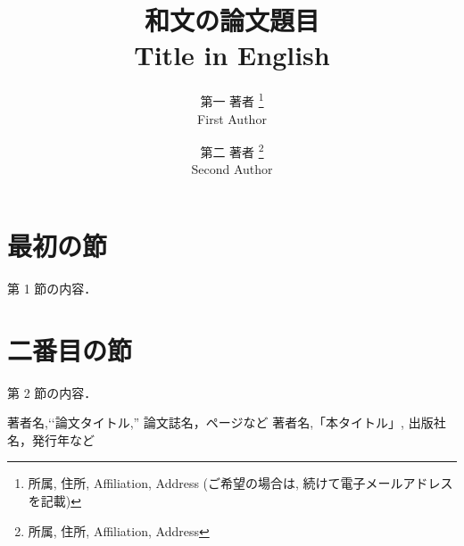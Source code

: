 \documentclass{jarticle} %
\begin{document}
\title{
	和文の論文題目
	\\
	Title in English
}

\author{
	第一 著者             %
	\thanks{
		所属, 住所,         %
		Affiliation, Address    %
		(ご希望の場合は, 続けて電子メールアドレスを記載)
	}\\
	First Author          %
	\and
	第二 著者             %
	\thanks{ %
		所属, 住所,         %
		Affiliation, Address   %
	}\\
	Second Author         %
}

\maketitle

\section{最初の節}

第 1 節の内容．

\section{二番目の節}

第 2 節の内容．


\begin{thebibliography}{9}
	著者名,\lq\lq 論文タイトル,'' 論文誌名，ページなど
	著者名,「本タイトル」, 出版社名，発行年など
\end{thebibliography}
\end{document}
